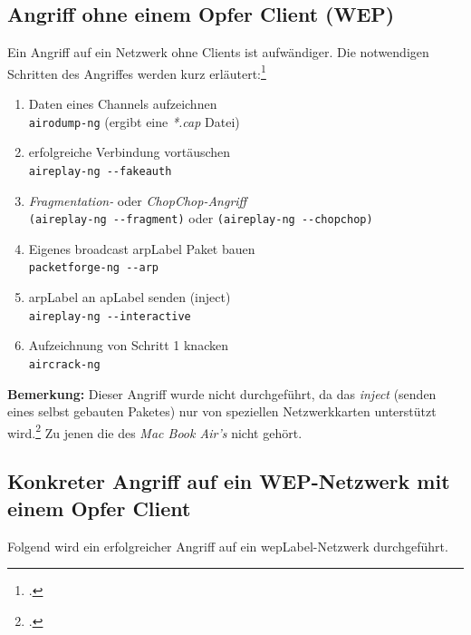 \subsection{Angriff ohne einem Opfer Client (WEP)}
Ein Angriff auf ein Netzwerk ohne Clients ist aufwändiger.
Die notwendigen Schritten des Angriffes werden kurz erläutert:\footcite[][129f.]{WrightCache201503}
\begin{enumerate}
	\item Daten eines Channels aufzeichnen\\
	\texttt{airodump-ng} (ergibt eine \textit{*.cap} Datei)
	
	\item erfolgreiche Verbindung vortäuschen\\
	\texttt{aireplay-ng  -{}-fakeauth}
	
	\item \textit{Fragmentation-} oder \textit{ChopChop-Angriff}\\
	\texttt{(aireplay-ng -{}-fragment)} oder \texttt{(aireplay-ng -{}-chopchop)}
	
	\item Eigenes broadcast \gls{arpLabel} Paket bauen\\
	\texttt{packetforge-ng -{}-arp}
	
	\item \gls{arpLabel} an \gls{apLabel} senden (inject)\\
	\texttt{aireplay-ng -{}-interactive}
	
	\item Aufzeichnung von Schritt 1 knacken\\
	\texttt{aircrack-ng}
	
\end{enumerate}

\begin{framed}
	\textbf{Bemerkung:} Dieser Angriff wurde nicht durchgeführt, da das \textit{inject} (senden eines selbst gebauten Paketes) nur von speziellen Netzwerkkarten unterstützt wird.\footcite[][89f.]{WrightCache201503}
	Zu jenen die des \textit{Mac Book Air's} nicht gehört.
\end{framed}


\subsection{Konkreter Angriff auf ein WEP-Netzwerk mit einem Opfer Client}
\label{sec:wepAttack}
Folgend wird ein erfolgreicher Angriff auf ein \gls{wepLabel}-Netzwerk durchgeführt.


